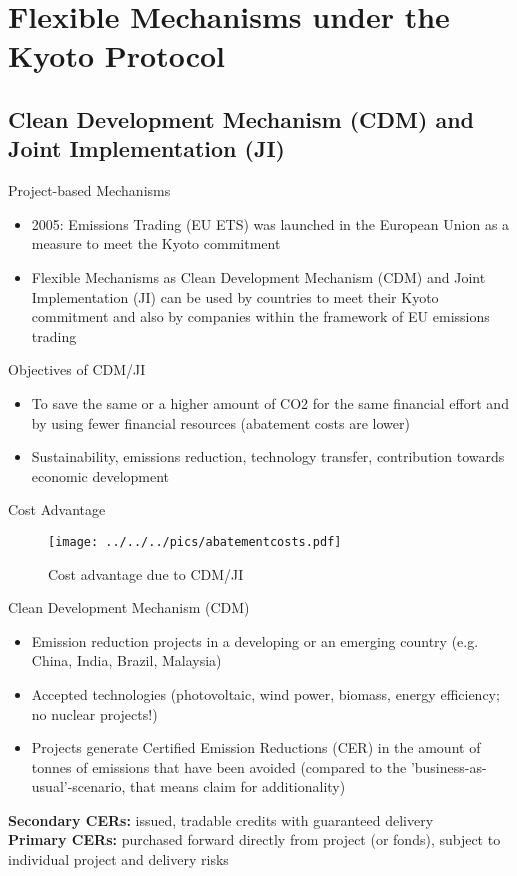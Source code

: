 \section{Flexible Mechanisms under the Kyoto Protocol}
\subsection{Clean Development Mechanism (CDM) and Joint Implementation (JI)}

{Project-based Mechanisms}
\begin{itemize}
\item<1-> 2005:  Emissions Trading (EU ETS) was launched in the European Union as a measure to meet the Kyoto commitment
\item<2-> Flexible Mechanisms as Clean Development Mechanism (CDM) and Joint Implementation (JI) can be used by countries to meet their Kyoto commitment and also by companies within the framework of EU emissions trading
\end{itemize}
Objectives of CDM/JI
\begin{itemize}
\item<1-> To save the same or a higher amount of CO2 for the same financial effort and by using fewer financial resources (abatement costs are lower)
\item<2-> Sustainability, emissions reduction, technology transfer, contribution towards economic development
 \end{itemize}


{Cost Advantage}
\begin{figure}[h!]
\centering
\texttt{[image: ../../../pics/abatementcosts.pdf]}
\caption{Cost advantage due to CDM/JI}
\label{fig:CDM/JI}
\end{figure}


{Clean Development Mechanism (CDM)}
\begin{itemize}
\item <1-> Emission reduction projects in a developing or an emerging country (e.g. China, India, Brazil, Malaysia)
\item <2-> Accepted technologies (photovoltaic, wind power, biomass, energy efficiency; no nuclear projects!)
\item <3-> Projects generate Certified Emission Reductions (CER) in the amount of tonnes of emissions that have been avoided (compared to the 'business-as-usual'-scenario, that means claim for additionality)
\end{itemize}
\textbf{Secondary CERs:} issued, tradable credits with guaranteed delivery \\
\textbf{Primary CERs:} purchased forward directly from project (or fonds), subject to individual project and delivery risks

